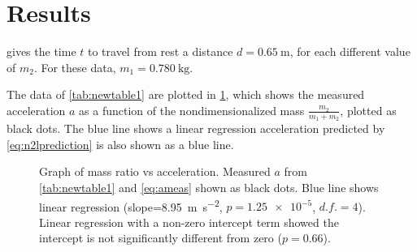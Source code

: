 ﻿\documentclass[reprint,amsmath,amssymb,aps]{revtex4-2}
\begin{document}
%
%
%
%
%
%
%




\section{Results}
 gives the time $t$ to travel from rest a distance $d=\qty{0.65}{\meter}$, for each different value of $m_2$. For these data, $m_1=\qty{0.780}{\kilo\gram}$. 


The data of \cref{tab:newtable1} are plotted in \cref{fig:graph}, which shows the measured acceleration $a$ as a function of the nondimensionalized mass $\frac{m_2}{m_1+m_2}$, plotted as black dots. The blue line shows a linear regression acceleration predicted by \cref{eq:n2lprediction} is also shown as a blue line. 
\begin{figure}
\begin{center}

\end{center}
\caption{\label{fig:graph} Graph of mass ratio vs acceleration. Measured $a$ from \cref{tab:newtable1} and \cref{eq:ameas} shown as black dots.  Blue line shows linear regression (slope=\qty{8.95}{\meter\per\second\squared}, $p=\num{1.25e-5}$, $d.f.=4$). Linear regression with a non-zero intercept term showed the intercept is not significantly different from zero ($p=0.66$).}  
\end{figure}
\end{document}
